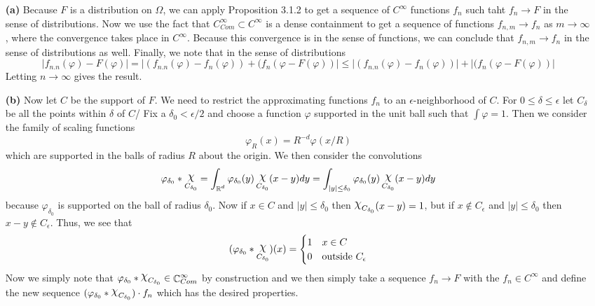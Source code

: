 \documentclass{article}
\DeclareMathOperator{\R}{\mathbb{R}}
\DeclareMathOperator{\C}{\mathbb{C}}
\DeclareMathOperator{\capchi}{\raisebox{2pt}{$\mathlarger{\mathlarger{\chi}}$}}
\newcommand{\exercise}[1]{\noindent{\textbf{Exercise #1:}}}
\begin{document}
\exercise{3.4.4}
\begin{enumerate}
\item[\textbf{(a)}] Because $F$ is a distribution on $\Omega$, we can
  apply Proposition 3.1.2 to get a sequence of $C^\infty$ functions
  $f_n$ such taht $f_n \to F$ in the sense of distributions. Now we
  use the fact that $C_{Com}^\infty \subset C^\infty$ is a dense
  containment to get a sequence of functions $f_{n,m} \to f_n$ as
  $m\to\infty$, where the convergence takes place in
  $C^\infty$. Because this convergence is in the sense of functions,
  we can conclude that $f_{n,m} \to f_n$ in the sense of distributions
  as well. Finally, we note that in the sense of distributions
  \[
  |f_{n.n}(\varphi) - F(\varphi)| = |(f_{n.n}(\varphi) -
  f_n(\varphi))+ (f_n(\varphi - F(\varphi))| \leq |(f_{n.n}(\varphi) -
  f_n(\varphi))| + |(f_n(\varphi - F(\varphi))|
  \]
  Letting $n \to \infty$ gives the result.
\item[\textbf{(b)}] Now let $C$ be the support of $F$. We need to
  restrict the approximating functions $f_n$ to an
  $\epsilon$-neighborhood of $C$. For $0 \leq \delta \leq \epsilon$
  let $C_\delta$ be all the points within $\delta$ of $C$/ Fix a
  $\delta_0 < \epsilon/2$ and choose a function $\varphi$ supported in
  the unit ball such that $\int \varphi = 1$. Then we consider the
  family of scaling functions
  \[
  \varphi_R(x) = R^{-d}\varphi(x/R)
  \]
  which are supported in the balls of radius $R$ about the origin. We
  then consider the convolutions
  \[
  \varphi_{\delta_0} \ast \capchi_{C_{\delta_0}} = \int_{\R^d}
  \varphi_{\delta_0}(y)\capchi_{C_{\delta_0}}(x-y)dy = \int_{|y| \leq
    \delta_0}\varphi_{\delta_0}(y)\capchi_{C_{\delta_0}}(x-y)dy
  \]
  because $\varphi_{\delta_0}$ is supported on the ball of radius
  $\delta_0$. Now if $x \in C$ and $|y| \leq \delta_0$ then
  $\capchi_{C_{\delta_0}}(x-y) = 1$, but if $x \not\in C_{\epsilon}$
  and $|y| \leq \delta_0$ then $x-y \not\in C_{\epsilon}$. Thus, we
  see that
  \[
  (\varphi_{\delta_0} \ast \capchi_{C_{\delta_0}})(x) =
  \begin{cases}
    1 & x \in C \\
    0 & \text{outside }C_{\epsilon}
  \end{cases}
  \]
  Now we simply note that $\varphi_{\delta_0} \ast
  \capchi_{C_{\delta_0}} \in \C_{Com}^\infty$ by construction and we
  then simply take a sequence $f_n \to F$ with the $f_n \in
  C^{\infty}$ and define the new sequence $(\varphi_{\delta_0} \ast
  \capchi_{C_{\delta_0}})\cdot f_n$ which has the desired properties.
\end{enumerate}
\end{document}
